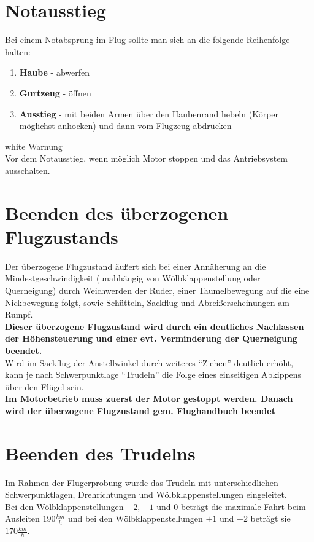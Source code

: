 \section{Notausstieg}

Bei einem Notabsprung im Flug sollte man sich an die folgende Reihenfolge halten: 
\begin{enumerate}
\item \textbf{Haube} - abwerfen
\item \textbf{Gurtzeug} - öffnen
\item \textbf{Ausstieg} - mit beiden Armen über den Haubenrand hebeln (Körper möglichst anhocken) und dann vom Flugzeug abdrücken
\end{enumerate}

\begin{color}{white}
\large{\underline{Warnung}}\\
Vor dem Notausstieg, wenn möglich Motor stoppen und das Antriebsystem ausschalten.
\end{color}

\section{Beenden des überzogenen Flugzustands}
Der überzogene Flugzustand äußert sich bei einer Annäherung an die Mindestgeschwindigkeit (unabhängig von Wölbklappenstellung oder Querneigung) durch Weichwerden der Ruder, einer Taumelbewegung auf die eine Nickbewegung folgt, sowie Schütteln, Sackflug und Abreißerscheinungen am Rumpf.\\
\newline
\textbf{Dieser überzogene Flugzustand wird durch ein deutliches Nachlassen der Höhensteuerung und einer evt. Verminderung der Querneigung beendet.}\\
\newline
Wird im Sackflug der Anstellwinkel durch weiteres "`Ziehen"' deutlich erhöht, kann je nach Schwerpunktlage "`Trudeln"' die Folge eines einseitigen Abkippens über den Flügel sein.\\

\textbf{Im Motorbetrieb muss zuerst der Motor gestoppt werden. Danach wird der überzogene Flugzustand gem. Flughandbuch beendet}
\newpage
\section{Beenden des Trudelns}
Im Rahmen der Flugerprobung wurde das Trudeln mit unterschiedlichen Schwerpunktlagen, Drehrichtungen und Wölbklappenstellungen eingeleitet.\\
Bei den Wölbklappenstellungen \textbf{$-2$}, \textbf{$-1$} und \textbf{$0$} beträgt die maximale Fahrt beim Ausleiten \textbf{$190\frac{km}{h}$} und bei den Wölbklappenstellungen \textbf{$+1$} und \textbf{$+2$} beträgt sie \textbf{$170\frac{km}{h}$}.
\newline

